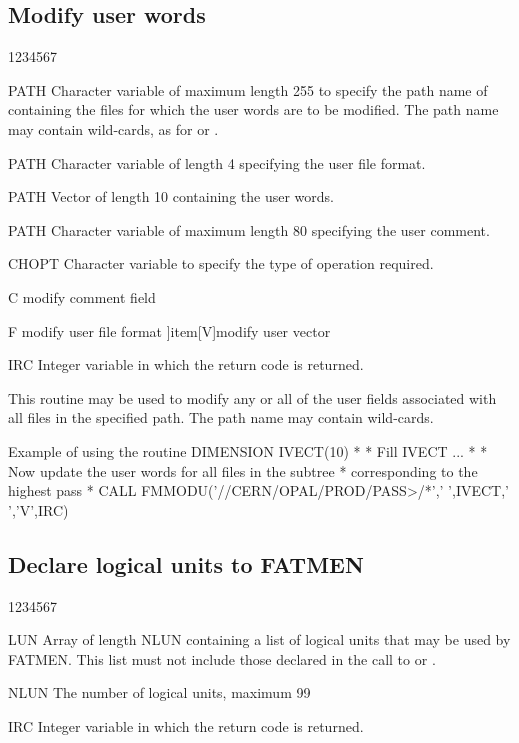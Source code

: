 \subsection{Modify user words}
\begin{DLtt}{1234567}
\item[PATH]
Character variable of maximum length 255 to specify the path name of
containing the files for which the user words are to be modified.
The path name may contain wild-cards, as for  or .
\item[PATH]
Character variable of length 4 specifying the user file format.
\item[PATH]
Vector of length 10 containing the user words.
\item[PATH]
Character variable of maximum length 80 specifying the user comment.
\item[CHOPT]
Character variable to specify the type of operation required.
\begin{DLtt}{12}
\item[C]modify comment field
\item[F]modify user file format
]item[V]modify user vector
\end{DLtt}
\item[IRC]
Integer variable in which the return code is returned.
\end{DLtt}
\par
This routine may be used to modify any or all of the user fields
associated with all files in the specified path. The path name
may contain wild-cards.
\begin{XMPt}{Example of using the \protect{} routine}
      DIMENSION  IVECT(10)
*
*     Fill IVECT
...
*
*     Now update the user words for all files in the subtree 
*     corresponding to the highest pass
*
      CALL FMMODU('//CERN/OPAL/PROD/PASS>/*',' ',IVECT,' ','V',IRC)
\end{XMPt}
\subsection{Declare logical units to FATMEN}
\begin{DLtt}{1234567}
\item[LUN]
Array of length NLUN containing a list of logical units
that may be used by FATMEN. This list must not include
those declared in the call to  or .
\item[NLUN]
The number of logical units, maximum 99
\item[IRC]
Integer variable in which the return code is returned.
\end{DLtt}
